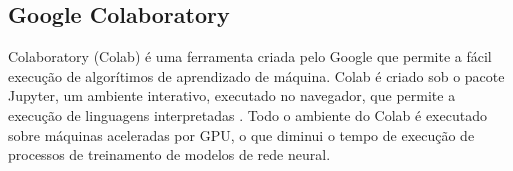 \subsection{Google Colaboratory}


\par Colaboratory (Colab) é uma ferramenta criada pelo Google que permite a fácil execução de algorítimos de aprendizado de máquina. Colab é criado sob o pacote Jupyter, um ambiente interativo, executado no navegador, que permite a execução de linguagens interpretadas \cite{PER-GRA:2007}. Todo o ambiente do Colab é executado sobre máquinas aceleradas por GPU, o que diminui o tempo de execução de processos de treinamento de modelos de rede neural.
